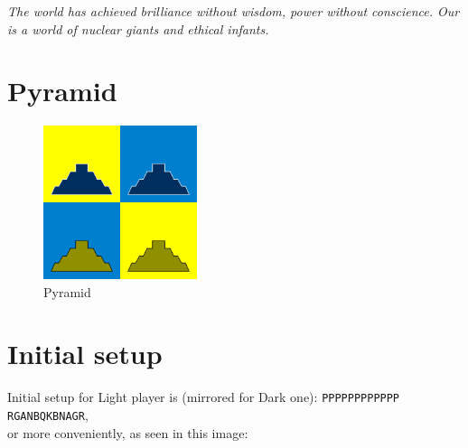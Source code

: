 \documentclass[a5paper,12pt,draft]{book} %
\begin{document}
\begin{flushright}
\parbox{0.8\textwidth}{
\emph{The world has achieved brilliance without wisdom, power without
conscience. Our is a world of nuclear giants and ethical infants. \\
 } }
\end{flushright}

\section*{Pyramid}

\noindent
\begin{figure}
\includegraphics[width=0.4\textwidth, keepaspectratio=true]{../gfx/pieces/08_pyramid.png}
\caption{Pyramid}
\label{fig:pyramid}
\end{figure}

\clearpage

\section*{Initial setup}

Initial setup for Light player is (mirrored for Dark one):
\texttt{PPPPPPPPPPPP \\
        RGANBQKBNAGR}, \\
or more conveniently, as seen in this image:
\end{document}
